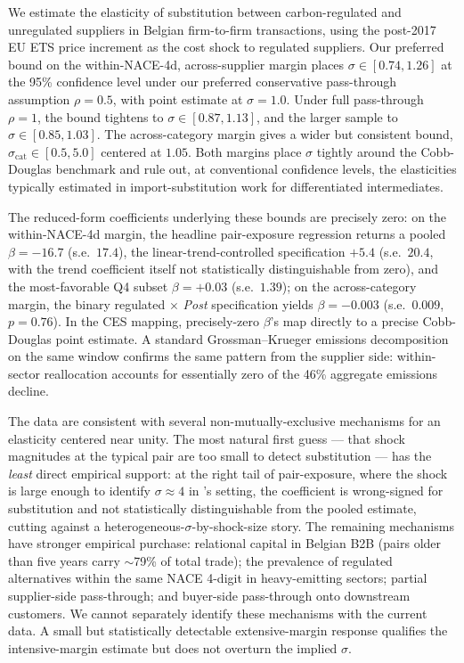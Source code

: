 We estimate the elasticity of substitution between carbon-regulated and unregulated suppliers in Belgian firm-to-firm transactions, using the post-2017 EU ETS price increment as the cost shock to regulated suppliers. Our preferred bound on the within-NACE-4d, across-supplier margin places $\sigma \in [0.74, 1.26]$ at the 95\% confidence level under our preferred conservative pass-through assumption $\rho = 0.5$, with point estimate at $\sigma = 1.0$. Under full pass-through $\rho = 1$, the bound tightens to $\sigma \in [0.87, 1.13]$, and the larger sample to $\sigma \in [0.85, 1.03]$. The across-category margin gives a wider but consistent bound, $\sigma_{\text{cat}} \in [0.5, 5.0]$ centered at $1.05$. Both margins place $\sigma$ tightly around the Cobb-Douglas benchmark and rule out, at conventional confidence levels, the elasticities typically estimated in import-substitution work for differentiated intermediates.

The reduced-form coefficients underlying these bounds are precisely zero: on the within-NACE-4d margin, the headline pair-exposure regression returns a pooled $\beta = -16.7$ (s.e.\ $17.4$), the linear-trend-controlled specification $+5.4$ (s.e.\ $20.4$, with the trend coefficient itself not statistically distinguishable from zero), and the most-favorable Q4 subset $\beta = +0.03$ (s.e.\ $1.39$); on the across-category margin, the binary regulated $\times$ \textit{Post} specification yields $\beta = -0.003$ (s.e.\ $0.009$, $p = 0.76$). In the CES mapping, precisely-zero $\beta$'s map directly to a precise Cobb-Douglas point estimate. A standard Grossman--Krueger emissions decomposition on the same window confirms the same pattern from the supplier side: within-sector reallocation accounts for essentially zero of the 46\% aggregate emissions decline.

The data are consistent with several non-mutually-exclusive mechanisms for an elasticity centered near unity. The most natural first guess --- that shock magnitudes at the typical pair are too small to detect substitution --- has the \emph{least} direct empirical support: at the right tail of pair-exposure, where the shock is large enough to identify $\sigma \approx 4$ in \citet{peter2023}'s setting, the coefficient is wrong-signed for substitution and not statistically distinguishable from the pooled estimate, cutting against a heterogeneous-$\sigma$-by-shock-size story. The remaining mechanisms have stronger empirical purchase: relational capital in Belgian B2B (pairs older than five years carry $\sim$79\% of total trade); the prevalence of regulated alternatives within the same NACE 4-digit in heavy-emitting sectors; partial supplier-side pass-through; and buyer-side pass-through onto downstream customers. We cannot separately identify these mechanisms with the current data. A small but statistically detectable extensive-margin response qualifies the intensive-margin estimate but does not overturn the implied $\sigma$.

